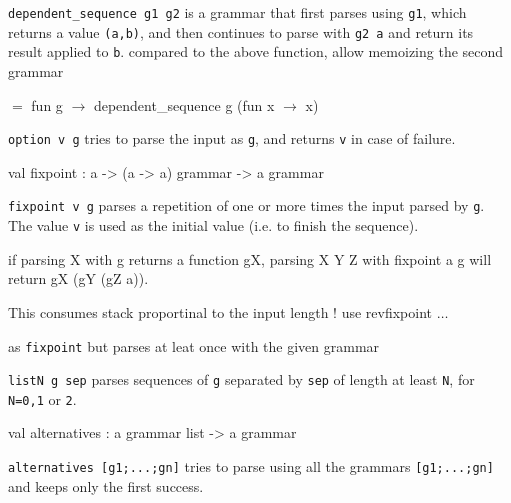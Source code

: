 \documentclass[11pt]{article}
\begin{document}
{\tt{dependent\_sequence g1 g2}} is a grammar that first parses using {\tt{g1}},
    which returns a value {\tt{(a,b)}}, and then continues to parse with {\tt{g2 a}} and
    return its result applied to {\tt{b}}. compared to the above function, allow
    memoizing the second grammar



$=$ fun g $\rightarrow$ dependent\_sequence g (fun x $\rightarrow$ x)



{\tt{option v g}} tries to parse the input as {\tt{g}}, and returns {\tt{v}} in case of
    failure.



\label{val:Earley.fixpoint}\begin{ocamldoccode}
val fixpoint : {\textquotesingle}a -> ({\textquotesingle}a -> {\textquotesingle}a) grammar -> {\textquotesingle}a grammar
\end{ocamldoccode}
\begin{ocamldocdescription}
{\tt{fixpoint v g}} parses a repetition of one or more times the input parsed
    by {\tt{g}}. The value {\tt{v}} is used as the initial value (i.e. to finish the
    sequence).


    if parsing X with g returns a function gX, parsing X Y Z with fixpoint a g
    will return gX (gY (gZ a)).


    This consumes stack proportinal to the input length ! use revfixpoint $\ldots$


\end{ocamldocdescription}




as {\tt{fixpoint}} but parses at leat once with the given grammar



{\tt{listN g sep}} parses sequences of {\tt{g}} separated by  {\tt{sep}} of length at
    least {\tt{N}}, for {\tt{N=0,1}} or {\tt{2}}.



\label{val:Earley.alternatives}\begin{ocamldoccode}
val alternatives : {\textquotesingle}a grammar list -> {\textquotesingle}a grammar
\end{ocamldoccode}
\begin{ocamldocdescription}
{\tt{alternatives [g1;...;gn]}} tries to parse using all the grammars
    {\tt{[g1;...;gn]}} and keeps only the first success.


\end{ocamldocdescription}
\end{document}
